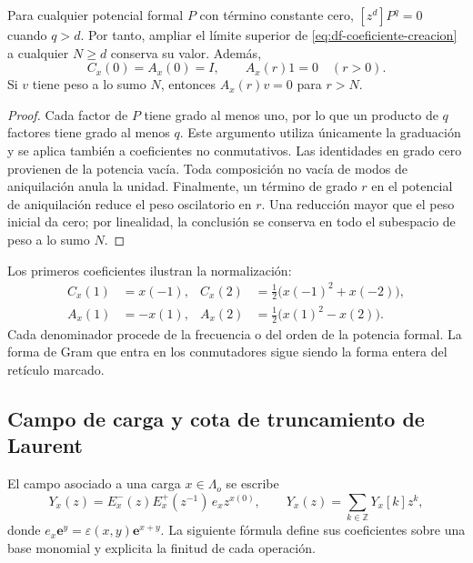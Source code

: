 \begin{lemma}
\label{lem:df-estabilizacion}
Para cualquier potencial formal \(P\) con término constante cero,
\([z^d]P^q=0\) cuando \(q>d\). Por tanto, ampliar el límite superior
de \eqref{eq:df-coeficiente-creacion} a cualquier \(N\geq d\) conserva
su valor. Además,
\[
 C_x(0)=A_x(0)=I,
 \qquad A_x(r)1=0\quad(r>0).
\]
Si \(v\) tiene peso a lo sumo \(N\), entonces \(A_x(r)v=0\) para
\(r>N\).
\end{lemma}

\begin{proof}
Cada factor de \(P\) tiene grado al menos uno, por lo que un producto de
\(q\) factores tiene grado al menos \(q\). Este argumento utiliza
únicamente la graduación y se aplica también a coeficientes no
conmutativos. Las identidades en grado cero provienen de la potencia
vacía. Toda composición no vacía de modos de aniquilación anula la
unidad. Finalmente, un término de grado \(r\) en el potencial de
aniquilación reduce el peso oscilatorio en \(r\). Una reducción mayor
que el peso inicial da cero; por linealidad, la conclusión se conserva
en todo el subespacio de peso a lo sumo \(N\).
\end{proof}

Los primeros coeficientes ilustran la normalización:
\begin{align*}
 C_x(1)&=x(-1),&
 C_x(2)&=\tfrac12\bigl(x(-1)^2+x(-2)\bigr),\\
 A_x(1)&=-x(1),&
 A_x(2)&=\tfrac12\bigl(x(1)^2-x(2)\bigr).
\end{align*}
Cada denominador procede de la frecuencia o del orden de la potencia
formal. La forma de Gram que entra en los conmutadores sigue siendo la
forma entera del retículo marcado.

\subsection{Campo de carga y cota de truncamiento de Laurent}
\label{subsec:df-campo-carga}


El campo asociado a una carga \(x\in\Lambda_o\) se escribe
\begin{equation}
 Y_x(z)=E^-_x(z)E^+_x(z^{-1})\,e_x z^{x(0)},
 \qquad Y_x(z)=\sum_{k\in\mathbb Z}Y_x[k]z^k,
 \label{eq:df-campo}
\end{equation}
donde \(e_x\mathbf e^y=\varepsilon(x,y)\mathbf e^{x+y}\).
La siguiente fórmula define sus coeficientes sobre una base monomial y
explicita la finitud de cada operación.

